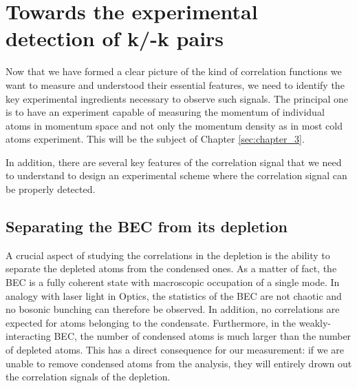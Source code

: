 \section{Towards the experimental detection of k/-k pairs}

Now that we have formed a clear picture of the kind of correlation functions we want to measure and understood their essential features, we need to identify the key experimental ingredients necessary to observe such signals. The principal one is to have an experiment capable of measuring the momentum of individual atoms in momentum space and not only the momentum density as in most cold atoms experiment. This will be the subject of Chapter \ref{sec:chapter_3}. 

In addition, there are several key features of the \kmk correlation signal that we need to understand to design an experimental scheme where the \kmk correlation signal can be properly detected.


\subsection{Separating the BEC from its depletion}

A crucial aspect of studying the correlations in the depletion is the ability to separate the depleted atoms from the condensed ones. As a matter of fact, the BEC is a fully coherent state with macroscopic occupation of a single mode. In analogy with laser light in Optics, the statistics of the BEC are not chaotic and no bosonic bunching can therefore be observed. In addition, no \kmk correlations are expected for atoms belonging to the condensate. Furthermore, in the weakly-interacting BEC, the number of condensed atoms is much larger than the number of depleted atoms. This has a direct consequence for our measurement: if we are unable to remove condensed atoms from the analysis, they will entirely drown out the correlation signals of the depletion.

